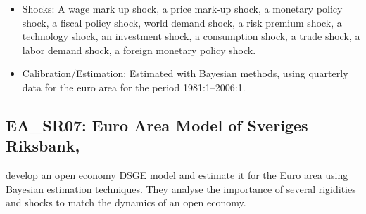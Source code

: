 \documentclass[11pt,a4paper]{article}
\begin{document}
\begin{itemize}
		\item Shocks: A wage mark up shock, a price mark-up shock, a monetary policy shock, a fiscal policy shock, world demand shock, a risk premium shock, a technology shock, an investment shock, a consumption shock, a trade shock, a labor demand shock, a foreign monetary policy shock.
		
		\item Calibration/Estimation: Estimated with Bayesian methods, using quarterly data for the euro area for the period 1981:1--2006:1.
		
		
	\end{itemize}
	
	
	\subsection{EA\_SR07: Euro Area Model of Sveriges Riksbank, \cite{AdolfsonLaseenLindeVillani2007}}
	\label{EASR07}
	\cite{AdolfsonLaseenLindeVillani2007} develop an open economy DSGE model and estimate it for the Euro area using Bayesian estimation techniques. They analyse the importance of several rigidities and shocks to match the dynamics of an open economy.
\end{document}
